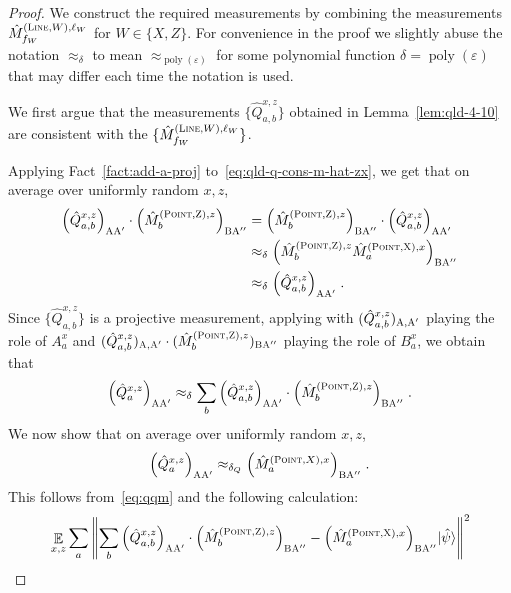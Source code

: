 \documentclass[11pt]{article}
\theoremstyle{definition}
\newcommand{\ket}[1]{|#1\rangle}
\DeclareMathOperator{\poly}{poly}
\newcommand{\eps}{\varepsilon}
\newcommand{\norm}[1]{\left\| {#1} \right\|}
\newcommand{\E}{\mathop{\mathbb{E}}\displaylimits}
\newcommand{\labelstyle}[1]{\ensuremath{\textsc{#1}}\xspace}
\newcommand{\xpt}{\labelstyle{X}}
\newcommand{\zpt}{\labelstyle{Z}}
\newcommand{\alice}{\labelstyle{A}}
\newcommand{\bob}{\labelstyle{B}}
\newcommand{\typestyle}[1]{\ensuremath{\textsc{#1}}\xspace}
\renewcommand{\line}{\mathbf{\ell}}
\newcommand{\Point}{\typestyle{Point}}
\newcommand{\Line}{\typestyle{Line}}
\begin{document}
\begin{proof}
  We construct the required measurements by combining the measurements
  $\hat{M}^{(\Line,W),\line_W}_{f_W}$ for $W \in \{X, Z\}$. For convenience in the proof we slightly abuse the notation $\approx_\delta$ to mean $\approx_{\poly(\eps)}$ for some polynomial function $\delta=\poly(\eps)$ that may differ each time the notation is used.

  	We first argue that the measurements $\{ \hat{Q}^{x,z}_{a,b} \}$ obtained in Lemma~\ref{lem:qld-4-10} are consistent with the $\{\hat{M}^{(\Line,W),\line_W}_{f_W} \}$. 

	Applying Fact~\ref{fact:add-a-proj} to~\eqref{eq:qld-q-cons-m-hat-zx}, we get that on average over uniformly random $x,z$,
	\begin{align}
		\Big( \hat{Q}^{x,z}_{a,b} \Big)_{\alice \alice'} \cdot \Big( \hat{M}^{(\Point,\zpt),z}_{b} \Big)_{\bob \alice''}
&=	\Big( \hat{M}^{(\Point,\zpt),z}_{b} \Big)_{\bob \alice''}\cdot	\Big( \hat{Q}^{x,z}_{a,b} \Big)_{\alice \alice'} \notag\\
& \approx_\delta \Big (\hat{M}^{(\Point,\zpt),z}_{b} \hat{M}^{(\Point,\xpt),x}_{a} \Big)_{\bob \alice''} \notag\\
&\approx_\delta \Big( \hat{Q}^{x,z}_{a,b} \Big)_{\alice \alice'}\;.\notag
	\end{align}
	Since $\{\hat{Q}^{x,z}_{a,b}\}$ is a projective measurement, applying  with $(\hat{Q}^{x,z}_{a,b})_{\alice, \alice'}$ playing the role of $A^{x}_a$ and $(\hat{Q}^{x,z}_{a,b} )_{\alice, \alice'} \cdot (\hat{M}^{(\Point, \zpt), z}_{b})_{\bob \alice''}$ playing the role of $B^{x}_a$, we obtain that
	\begin{equation}
	\Big( \hat{Q}^{x,z}_{a} \Big)_{\alice \alice'} \approx_\delta \sum_b \Big( \hat{Q}^{x,z}_{a,b} \Big)_{\alice \alice'} \cdot \Big( \hat{M}^{(\Point,\zpt),z}_{b} \Big)_{\bob \alice''}\;.\label{eq:qqm}
	\end{equation}
	We now show that on average over uniformly random $x,z$, 
	\begin{equation}
	\label{eq:qld-qxz-close-to-point}
	\Big ( \hat{Q}^{x,z}_{a} \Big)_{\alice \alice'} \approx_{\delta_Q} \Big (\hat{M}^{(\Point,X),x}_{a} \Big)_{\bob \alice''} \;.
	\end{equation}
	This follows from~\eqref{eq:qqm} and the following calculation:
	\begin{align*}
		&\E_{x,z} \sum_a \norm{ \sum_b  \Big( \hat{Q}^{x,z}_{a,b} \Big)_{\alice \alice'} \cdot \Big ( \hat{M}^{(\Point,\zpt),z}_{b} \Big)_{\bob \alice''} - \Big ( \hat{M}^{(\Point,\xpt),x}_{a} \Big)_{\bob \alice''}  \ket{\hat{\psi}} }^2  \\

\end{align*}
\end{proof}
\end{document}

